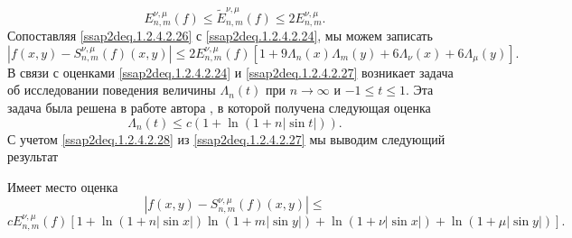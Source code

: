 \begin{equation}\label{ssap2deq.1.2.4.2.26}
 E_{n,m}^{\nu,\mu}(f)\le \tilde E_{n,m}^{\nu,\mu}(f)\le 2E_{n,m}^{\nu,\mu}.
\end{equation}
Сопоставляя \eqref{ssap2deq.1.2.4.2.26} с \eqref{ssap2deq.1.2.4.2.24}, мы можем записать
\begin{equation}\label{ssap2deq.1.2.4.2.27}
|f(x,y)-S_{n,m}^{\nu,\mu}(f)(x,y)|\le 2 E_{n,m}^{\nu,\mu}(f)[1+9\Lambda_n(x)\Lambda_m(y)+6\Lambda_\nu(x)+6\Lambda_\mu(y)].
\end{equation}
В связи с оценками \eqref{ssap2deq.1.2.4.2.24} и \eqref{ssap2deq.1.2.4.2.27} возникает задача об исследовании поведения  величины $\Lambda_n(t)$ при $n\to\infty$ и $-1\le t\le 1$.
Эта задача была решена в работе автора \cite{shii2}, в которой получена следующая оценка
\begin{equation}\label{ssap2deq.1.2.4.2.28}
\Lambda_n(t)\le c(1+\ln(1+n|\sin t|)).
\end{equation}
С учетом \eqref{ssap2deq.1.2.4.2.28} из \eqref{ssap2deq.1.2.4.2.27} мы выводим следующий результат


\begin{theorem}\label{ssap2d:t1}
Имеет место оценка
$$
|f(x,y)-S_{n,m}^{\nu,\mu}(f)(x,y)|\le
$$
$$
 cE_{n,m}^{\nu,\mu}(f)[1+\ln(1+n|\sin x|)\ln(1+m|\sin y|)+\ln(1+\nu|\sin x|)+\ln(1+\mu|\sin y|)].
$$
\end{theorem}

